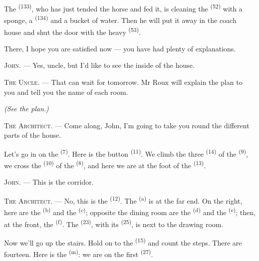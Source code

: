 The  \textsuperscript{(133)}, who has just tended the horse and fed it, is
cleaning the  \textsuperscript{(52)} with a sponge, a
 \textsuperscript{(134)} and a bucket of water. Then he will put
it away in the coach house and shut the door with the heavy 
\textsuperscript{(53)}.

There, I hope you are satisfied now --- you have had plenty of explanations.

\textsc{John}. --- Yes, uncle, but I'd like to see the inside of the house.

\textsc{The Uncle}. --- That can wait for tomorrow. Mr Roux will explain the plan to you and
tell you the name of each room.

\VUsaut{3.0mm}
\VUsaut{2.4mm}

{\centering\textit{(See the plan.)}\par}
\VUsaut{2.4mm}

\textsc{The Architect}. --- Come along, John, I'm going to take you round the different parts
of the house.

Let's go in on the  \textsuperscript{(7)}. Here is the
 button \textsuperscript{(11)}. We climb the three 
\textsuperscript{(14)} of the  \textsuperscript{(9)}, we cross the
 \textsuperscript{(10)} of the  \textsuperscript{(8)},
and here we are at the foot of the  \textsuperscript{(13)}.

\textsc{John}. --- This is the corridor.

\textsc{The Architect}. --- No, this is the  \textsuperscript{(12)}. The
 \textsuperscript{(a)} is at the far end. On the right, here are
the  \textsuperscript{(b)} and the 
\textsuperscript{(c)}; opposite the dining room are the  \textsuperscript{(d)}
and the  \textsuperscript{(e)}; then, at the front, the 
\textsuperscript{(f)}. The  \textsuperscript{(23)}, with its
 \textsuperscript{(25)}, is next to the drawing room.

Now we'll go up the stairs. Hold on to the  \textsuperscript{(15)} and count
the steps. There are fourteen. Here is the
 \textsuperscript{(m)}: we are on the first 
\textsuperscript{(27)}.

